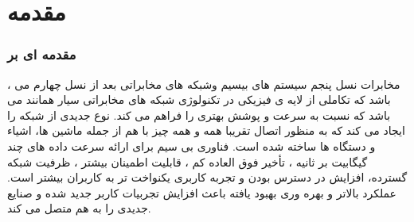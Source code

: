 \chapter{مقدمه}
\subsection{مقدمه ای بر  }
،
مخابرات نسل پنجم
سیستم های بیسیم  وشبکه های مخابراتی بعد از نسل چهارم می باشد که تکاملی از لایه ی فیزیکی در تکنولوژی شبکه های مخابراتی سیار همانند  می باشد که نسبت به  سرعت و پوشش بهتری را فراهم می کند.  
نوع جدیدی از شبکه را ایجاد می کند که به منظور اتصال تقریبا همه و همه چیز با هم از جمله ماشین ها، اشیاء و دستگاه ها ساخته شده است.
 فناوری بی سیم برای ارائه سرعت داده های چند گیگابیت بر ثانیه ، تأخیر فوق العاده کم ، قابلیت اطمینان بیشتر ، ظرفیت شبکه گسترده، افزایش در دسترس بودن و تجربه کاربری یکنواخت تر به کاربران بیشتر است. عملکرد بالاتر و بهره وری بهبود یافته باعث افزایش تجربیات کاربر جدید شده و صنایع جدیدی را به هم متصل می کند.
 
